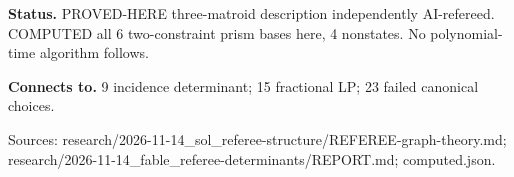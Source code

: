 \textbf{Status.} PROVED-HERE three-matroid description independently AI-refereed. COMPUTED all 6 two-constraint prism bases here, 4 nonstates. No polynomial-time algorithm follows.

\textbf{Connects to.} 9 incidence determinant; 15 fractional LP; 23 failed canonical choices.

{\footnotesize\raggedright Sources: research/\allowbreak{}2026-11-14\_sol\_referee-structure/\allowbreak{}REFEREE-graph-theory.md;\allowbreak{} research/\allowbreak{}2026-11-14\_fable\_referee-determinants/\allowbreak{}REPORT.md;\allowbreak{} computed.json.\par}
